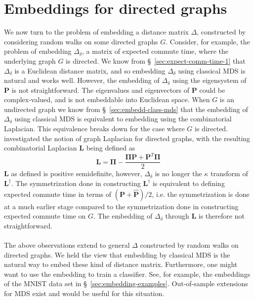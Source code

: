\section{Embeddings for directed graphs}
\label{sec:embedd-dist-direct}
We now turn to the problem of embedding a distance matrix $\Delta$,
constructed by considering random walks on some directed graphs
$G$. Consider, for example, the problem of embedding $\Delta_{\delta}$,
a matrix of expected commute time, where the underlying graph $G$ is
directed. We know from \S~\ref{sec:expect-comm-time-1} that
$\Delta_{\delta}$ is a Euclidean distance matrix, and so embedding
$\Delta_\delta$ using classical MDS is natural and works
well. However, the embedding of $\Delta_\delta$ using the eigensystem
of $\mathbf{P}$ is not straightforward. The eigenvalues and
eigenvectors of $\mathbf{P}$ could be complex-valued, and is not
embeddable into Euclidean space. When $G$ is an undirected graph we
know from \S~\ref{sec:embedd-class-mds} that the
embedding of $\Delta_{\delta}$ using classical MDS is equivalent to
embedding using the combinatorial Laplacian. This equivalence breaks
down for the case where $G$ is directed. \citet{chung05:_laplac_cheeg}
investigated the notion of graph Laplacian for directed graphs, with the
resulting combinatorial Laplacian $\mathbf{L}$ being defined as
\begin{equation}
  \label{eq:125}
  \mathbf{L} = \bm{\Pi} - \frac{\bm{\Pi}\mathbf{P} + \mathbf{P}^{T}\bm{\Pi}}{2}
\end{equation}
$\mathbf{L}$ as defined is positive semidefinite, however,
$\Delta_{\delta}$ is no longer the $\kappa$ transform of
$\mathbf{L}^{\dagger}$. The symmetrization done in
constructing $\mathbf{L}^{\dagger}$ is equivalent to defining 
expected commute time in terms of $(\mathbf{P} + \hat{\mathbf{P}})/2$,
i.e. the symmetrization is done at a much earlier stage compared to
the symmetrization done in constructing expected commute time on $G$.
The embedding of $\Delta_{\delta}$ through
$\mathbf{L}$ is therefore not straightforward. \\ \\
%
\noindent
The above observations extend to general $\Delta$ constructed by
random walks on directed graphs. We held the view that embedding by
classical MDS is the natural way to embed these kind of distance
matrix. Furthermore, one might want to use the embedding to train a
classifier. See, for example, the embeddings of the MNIST data set in
\S~\ref{sec:embedding-examples}. Out-of-sample extensions for MDS
exist and would be useful for this situation. 
%
